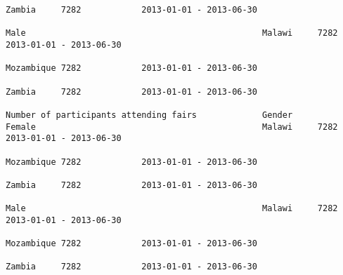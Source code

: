 \documentclass[11pt]{article}
\begin{document}
\begin{Verbatim}[commandchars=\\\{\}]
                                                                                                                                                                                                                 Zambia     7282            2013-01-01 - 2013-06-30   
                                                                                                                                                              Male                                               Malawi     7282            2013-01-01 - 2013-06-30   
                                                                                                                                                                                                                 Mozambique 7282            2013-01-01 - 2013-06-30   
                                                                                                                                                                                                                 Zambia     7282            2013-01-01 - 2013-06-30   
                                                                         Number of participants attending fairs             Gender                            Female                                             Malawi     7282            2013-01-01 - 2013-06-30   
                                                                                                                                                                                                                 Mozambique 7282            2013-01-01 - 2013-06-30   
                                                                                                                                                                                                                 Zambia     7282            2013-01-01 - 2013-06-30   
                                                                                                                                                              Male                                               Malawi     7282            2013-01-01 - 2013-06-30   
                                                                                                                                                                                                                 Mozambique 7282            2013-01-01 - 2013-06-30   
                                                                                                                                                                                                                 Zambia     7282            2013-01-01 - 2013-06-30   

\end{Verbatim}
\end{document}
